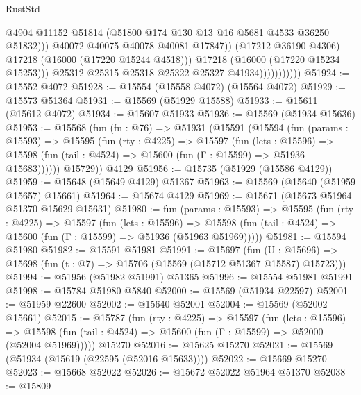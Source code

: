 \begin{lexlean}{RustStd}
\begin{coremodule}
                                      @4904
                                      @11152
                                      @51814
                                      (@51800 @174 @130 @13 @16 @5681 @4533 @36250 @51832)))
                                  @40072
                                  @40075
                                  @40078
                                  @40081
                                  @17847))
                              (@17212 @36190 @4306)
                              @17218
                              (@16000 (@17220 @15244 @4518)))
                            @17218
                            (@16000 (@17220 @15234 @15253)))
                          @25312
                          @25315
                          @25318
                          @25322
                          @25327
                          @41934)))))))))))
@51924 := @15552 @4072
@51928 := @15554 (@15558 @4072) (@15564 @4072)
@51929 := @15573 @51364
@51931 := @15569 (@51929 @15588)
@51933 := @15611 (@15612 @4072)
@51934 := @15607 @51933
@51936 := @15569 (@51934 @15636)
@51953 := @15568
    (fun (fn : @76) =>
    @51931
      (@15591
        (@15594
          (fun (params : @15593) =>
          @15595
            (fun (rty : @4225) =>
            @15597
              (fun (lets : @15596) =>
              @15598 (fun (tail : @4524) => @15600 (fun (Γ : @15599) => @51936 @15683))))))
        @15729))
    @4129
@51956 := @15735 (@51929 (@15586 @4129))
@51959 := @15648 (@15649 @4129) @51367
@51963 := @15569 (@15640 (@51959 @15657) @15661)
@51964 := @15674 @4129
@51969 := @15671 (@15673 @51964 @51370 @15629 @15631)
@51980 := fun (params : @15593) =>
  @15595
    (fun (rty : @4225) =>
    @15597
      (fun (lets : @15596) =>
      @15598 (fun (tail : @4524) => @15600 (fun (Γ : @15599) => @51936 (@51963 @51969)))))
@51981 := @15594 @51980
@51982 := @15591 @51981
@51991 := @15697
    (fun (U : @15696) => @15698 (fun (t : @7) => @15706 (@15569 (@15712 @51367 @15587) @15723)))
@51994 := @51956 (@51982 @51991) @51365
@51996 := @15554 @51981 @51991
@51998 := @15784 @51980 @5840
@52000 := @15569 (@51934 @22597)
@52001 := @51959 @22600
@52002 := @15640 @52001
@52004 := @15569 (@52002 @15661)
@52015 := @15787
    (fun (rty : @4225) =>
    @15597
      (fun (lets : @15596) =>
      @15598 (fun (tail : @4524) => @15600 (fun (Γ : @15599) => @52000 (@52004 @51969)))))
    @15270
@52016 := @15625 @15270
@52021 := @15569 (@51934 (@15619 (@22595 (@52016 @15633))))
@52022 := @15669 @15270
@52023 := @15668 @52022
@52026 := @15672 @52022 @51964 @51370
@52038 := @15809

\end{coremodule}
\end{lexlean}
